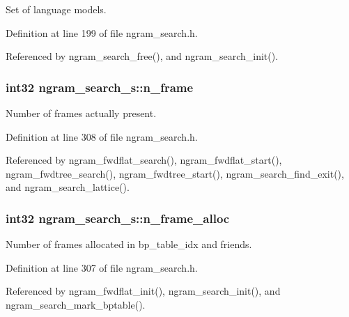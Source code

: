 Set of language models. 



Definition at line 199 of file ngram\+\_\+search.\+h.



Referenced by ngram\+\_\+search\+\_\+free(), and ngram\+\_\+search\+\_\+init().

\subsubsection[{n\+\_\+frame}]{\setlength{\rightskip}{0pt plus 5cm}int32 ngram\+\_\+search\+\_\+s\+::n\+\_\+frame}\label{structngram__search__s_a5255e56d28c239a4e1d9b1721e8a2f8d}


Number of frames actually present. 



Definition at line 308 of file ngram\+\_\+search.\+h.



Referenced by ngram\+\_\+fwdflat\+\_\+search(), ngram\+\_\+fwdflat\+\_\+start(), ngram\+\_\+fwdtree\+\_\+search(), ngram\+\_\+fwdtree\+\_\+start(), ngram\+\_\+search\+\_\+find\+\_\+exit(), and ngram\+\_\+search\+\_\+lattice().

\subsubsection[{n\+\_\+frame\+\_\+alloc}]{\setlength{\rightskip}{0pt plus 5cm}int32 ngram\+\_\+search\+\_\+s\+::n\+\_\+frame\+\_\+alloc}\label{structngram__search__s_a38ea5de504b3d7ad2390a3f8966d502f}


Number of frames allocated in bp\+\_\+table\+\_\+idx and friends. 



Definition at line 307 of file ngram\+\_\+search.\+h.



Referenced by ngram\+\_\+fwdflat\+\_\+init(), ngram\+\_\+search\+\_\+init(), and ngram\+\_\+search\+\_\+mark\+\_\+bptable().

